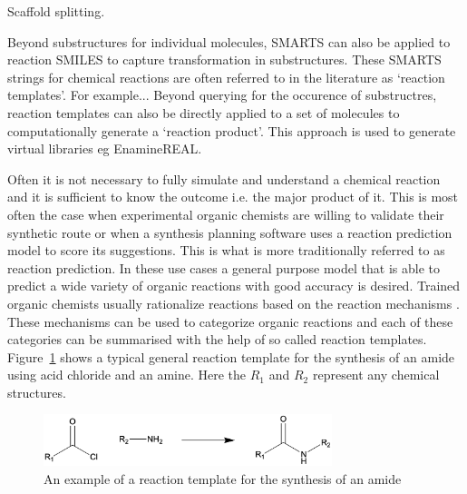 Scaffold splitting.

Beyond substructures for individual molecules, SMARTS can also be applied to reaction SMILES to capture transformation in substructures. These SMARTS strings for chemical reactions are often referred to in the literature as `reaction templates'. For example... Beyond querying for the occurence of substructres, reaction templates can also be directly applied to a set of molecules to computationally generate a `reaction product'. This approach is used to generate virtual libraries eg EnamineREAL.

Often it is not necessary to fully simulate and understand a chemical reaction and it is sufficient to know the outcome i.e. the major product of it. This is most often the case when experimental organic chemists are willing to validate their synthetic route or when a synthesis planning software uses a reaction prediction model to score its suggestions. This is what is more traditionally referred to as reaction prediction. In these use cases a general purpose model that is able to predict a wide variety of organic reactions with good accuracy is desired. Trained organic chemists usually rationalize reactions based on the reaction mechanisms \cite{Clayden2012}. These mechanisms can be used to categorize organic reactions and each of these categories can be summarised with the help of so called reaction templates. Figure~\ref{fig:rx_template} shows a typical general reaction template for the synthesis of an amide using acid chloride and an amine. Here the $R_1$ and $R_2$ represent any chemical structures.

\begin{figure}[htbp!] 
    \centering    
    \includegraphics[width=0.75\textwidth]{Chapters/Background/Figs/rx_template.png}
    \caption[Reaction template]{An example of a reaction template for the synthesis of an amide}
    \label{fig:rx_template}
\end{figure}

